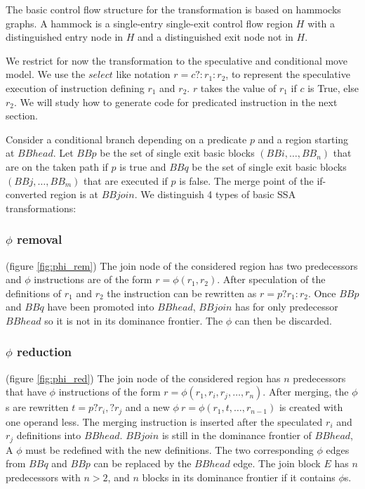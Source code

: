 The basic control flow structure for the transformation is based on hammocks graphs. A hammock is a single-entry single-exit control flow region $H$ with a distinguished entry node in $H$ and a distinguished exit node not in $H$. 

We restrict for now the transformation to the speculative and conditional move model. We use the $select$ like notation $r=c?:r_1:r_2$, to represent the speculative execution of instruction defining $r_1$ and $r_2$. $r$ takes the value of $r_1$ if $c$ is True, else $r_2$. We will study how to generate code for predicated instruction in the next section.

Consider a conditional branch depending on a predicate $p$ and a region starting at $BBhead$. Let $BBp$ be the set of single exit basic blocks $(BBi,\dots,BB_n)$ that are on the taken path if $p$ is true and $BBq$ be the set of single exit basic blocks $(BBj,\dots,BB_m)$ that are executed if $p$ is false. The merge point of the if-converted region is at $BBjoin$. We distinguish 4 types of basic SSA transformations:

\subsubsection{$\phi$ removal} (figure \ref{fig:phi_rem})
The join node of the considered region has two predecessors and $\phi$ instructions are of the form $r=\phi(r_1,r_2)$. After speculation of the definitions of $r_1$ and $r_2$ the instruction can be rewritten as $r=p?r_1:r_2$.
Once $BBp$ and $BBq$ have been promoted into $BBhead$, $BBjoin$ has for only predecessor $BBhead$ so it is not in its dominance frontier. The $\phi$ can then be discarded.

\subsubsection{$\phi$ reduction} (figure \ref{fig:phi_red})
 The join node of the considered region has $n$ predecessors that have $\phi$ instructions of the form $r=\phi(r_1,r_i,r_j,\dots,r_n)$. After merging, the $\phi$s are rewritten $t=p?r_i,?r_j$ and a new $\phi\:r=\phi(r_1,t,\dots,r_{n-1})$ is created with one operand less. The merging instruction is inserted after the speculated $r_i$ and $r_j$ definitions into $BBhead$.
$BBjoin$ is still in the dominance frontier of $BBhead$, A $\phi$ must be redefined with the new definitions. The two corresponding $\phi$ edges from $BBq$ and $BBp$ can be replaced by the $BBhead$ edge.
The join block $E$ has $n$ predecessors with $n > 2$, and $n$ blocks in its dominance frontier if it contains $\phi$s.

